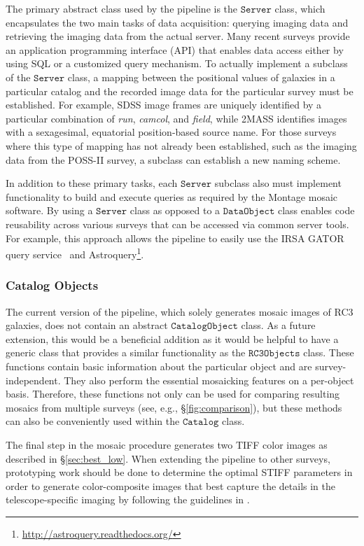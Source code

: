 \documentclass[authoryear, 12pt, 5p, times]{elsarticle}
\begin{document}
The primary abstract class used by the pipeline is the $\texttt{Server}$ class, which encapsulates the two main tasks of data acquisition: querying imaging data and retrieving the imaging data from the actual server. Many recent surveys provide an application programming interface (API) that enables data access either by using SQL or a customized query mechanism. To actually implement a subclass of the $\texttt{Server}$ class, a mapping between the positional values of galaxies in a particular catalog and the recorded image data for the particular survey must be established. For example, SDSS image frames are uniquely identified by a particular combination of \textit{run}, \textit{camcol}, and \textit{field}, while 2MASS identifies images with a sexagesimal, equatorial position-based source name. For those surveys where this type of mapping has not already been established, such as the imaging data from the POSS-II survey, a subclass can establish a new naming scheme.

In addition to these primary tasks, each $\texttt{Server}$ subclass also must implement functionality to build and execute queries as required by the Montage mosaic software. By using a $\texttt{Server}$ class as opposed to a $\texttt{DataObject}$ class enables code reusability across various surveys that can be accessed via common server tools. For example, this approach allows the pipeline to easily use the IRSA GATOR query service~\citep{irsa} and Astroquery\footnote{\url{http://astroquery.readthedocs.org/}}.

\subsubsection{Catalog Objects}

The current version of the pipeline, which solely generates mosaic images of RC3 galaxies, does not contain an abstract $\texttt{CatalogObject}$ class. As a future extension, this would be a beneficial addition as it would be helpful to have a generic class that provides a similar functionality as the $\texttt{RC3Objects}$ class. These functions contain basic information about the particular object and are survey-independent. They also perform the essential mosaicking features on a per-object basis. Therefore, these functions not only can be used for comparing resulting mosaics from multiple surveys (see, e.g., \S\ref{fig:comparison}), but these methods can also be conveniently used within the $\texttt{Catalog}$ class. 

The final step in the mosaic procedure generates two TIFF color images as described in \S\ref{sec:best_low}.  When extending the pipeline to other surveys, prototyping work should be done to determine the optimal STIFF parameters in order to generate color-composite images that best capture the details in the telescope-specific imaging by following the guidelines in \citet{stiff}.
\end{document}
